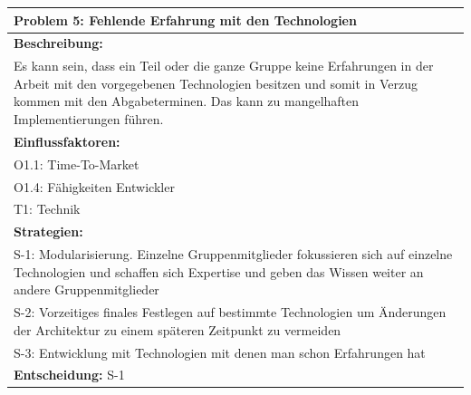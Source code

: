 \documentclass[fontsize=12pt,paper=a4,twoside]{scrartcl}
\begin{document}
\begin{longtable}{|p{15cm}|}
\hline
Problem 5: Fehlende Erfahrung mit den Technologien                                                                           
\\ \hline                                                                                                                                                                                                                                                                                                                                                                                                                                                                                                                                                        
\textbf{Beschreibung:} \\
Es kann sein, dass ein Teil oder die ganze Gruppe keine Erfahrungen in der Arbeit mit den vorgegebenen Technologien besitzen
und somit in Verzug kommen mit den Abgabeterminen. Das kann zu mangelhaften Implementierungen führen. 
\\ \hline
\textbf{Einflussfaktoren:} \\
O1.1: Time-To-Market \\
O1.4: Fähigkeiten Entwickler \\
T1: Technik
\\ \hline
\textbf{Strategien:} \\
S-1: Modularisierung. Einzelne Gruppenmitglieder fokussieren sich auf einzelne Technologien und schaffen sich Expertise und geben das Wissen weiter an andere Gruppenmitglieder\\
S-2: Vorzeitiges finales Festlegen auf bestimmte Technologien um Änderungen der Architektur zu einem späteren Zeitpunkt zu vermeiden \\
S-3: Entwicklung mit Technologien mit denen man schon Erfahrungen hat
 \\ \hline
 \textbf{Entscheidung:} S-1
\\ \hline
\end{longtable}
\end{document}
